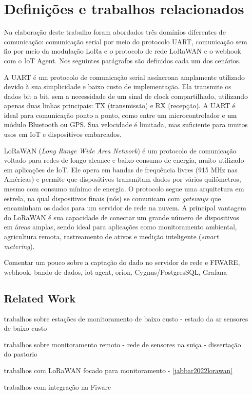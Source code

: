 
\section{Definições e trabalhos relacionados} \label{sec:definitions_related}
Na elaboração deste trabalho foram abordados três domínios diferentes de comunicação: comunicação serial por meio do protocolo UART, comunicação sem fio por meio da modulação LoRa e o protocolo de rede LoRaWAN e o webhook com o IoT Agent. Nos seguintes parágrafos são definidos cada um dos cenários. 

A UART é um protocolo de comunicação serial assíncrona amplamente utilizado devido à sua simplicidade e baixo custo de implementação. Ela transmite os dados bit a bit, sem a necessidade de um sinal de clock compartilhado, utilizando apenas duas linhas principais: TX (transmissão) e RX (recepção). A UART é ideal para comunicação ponto a ponto, como entre um microcontrolador e um módulo Bluetooth ou GPS. Sua velocidade é limitada, mas suficiente para muitos usos em IoT e dispositivos embarcados.

LoRaWAN (\textit{Long Range Wide Area Network}) é um protocolo de comunicação voltado para redes de longo alcance e baixo consumo de energia, muito utilizado em aplicações de IoT. Ele opera em bandas de frequência livres (915 MHz nas Américas) e permite que dispositivos transmitam dados por vários quilômetros, mesmo com consumo mínimo de energia. O protocolo segue uma arquitetura em estrela, na qual dispositivos finais (nós) se comunicam com \textit{gateways} que encaminham os dados para um servidor de rede na nuvem. A principal vantagem do LoRaWAN é sua capacidade de conectar um grande número de dispositivos em áreas amplas, sendo ideal para aplicações como monitoramento ambiental, agricultura remota, rastreamento de ativos e medição inteligente (\textit{smart metering}).

Comentar um pouco sobre a captação do dado no servidor de rede e FIWARE, webhook, bando de dados, iot agent, orion, Cygnus/PostgresSQL, Grafana


\subsection{Related Work}

trabalhos sobre estações de monitoramento de baixo custo
- estado da ar sensores de baixo custo

trabalhos sobre monitoramento remoto
- rede de sensores na suiça
- dissertação do pastorio

trabalhos com LoRaWAN focado para monitoramento
- \autoref{jabbar2022lorawan}


trabalhos com integração na Fiware
